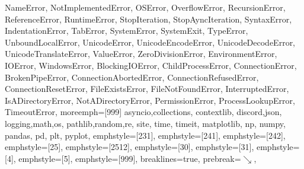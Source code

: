 {{  NameError, NotImplementedError, OSError, OverflowError, RecursionError,
  ReferenceError, RuntimeError, StopIteration, StopAyncIteration, SyntaxError,
  IndentationError, TabError, SystemError, SystemExit, TypeError,
  UnboundLocalError, UnicodeError, UnicodeEncodeError, UnicodeDecodeError,
  UnicodeTranslateError, ValueError, ZeroDivisionError, EnvironmentError,
  IOError, WindowsError,
  BlockingIOError, ChildProcessError, ConnectionError, BrokenPipeError,
  ConnectionAbortedError, ConnectionRefusedError, ConnectionResetError,
  FileExistsError, FileNotFoundError, InterruptedError, IsADirectoryError,
  NotADirectoryError, PermissionError, ProcessLookupError, TimeoutError},
  moreemph=[999]{%
  asyncio,collections, contextlib,
  discord,json,
  logging,math,os,
  pathlib,random,re, site,
  time, timeit,
  matplotlib, np, numpy, pandas, pd, plt, pyplot},
  emphstyle=[231]{\color{magenta}}, %
  emphstyle=[241]{\color{magenta}}, %
  emphstyle=[242]{\color{magenta}}, %
  emphstyle=[25]{\color{brightcyan}}, %
  emphstyle=[2512]{\color{brightblue}}, %
  emphstyle=[30]{\color{brightcyan}},
  emphstyle=[31]{\color{brightblue}}, %
  emphstyle=[4]{\color{brightmagenta}},
  emphstyle=[5]{\bfseries\color{red}},
  emphstyle=[999]{\color{brightyellow}}, %
  breaklines=true,
  prebreak=\mbox{{\color{brightblack}\scriptsize$\searrow$}},
}

\def\cconv#1{%
	\extractcolorspecs{#1}{\model}{\mycolor}
	\definecolor{w}{HTML}{FFFFFF} \definecolor{b}{HTML}{000000}
	\def\c@html{\convertcolorspec{\model}{\mycolor}{HTML}\tmp\tmp}
	\def\c@rgb{\convertcolorspec{\model}{\mycolor}{RGB}\tmp\tmp}
	\def\c@cmyk{\convertcolorspec{\model}{\mycolor}{cmyk}\tmp\tmp}
	\def\chonkyclr{\Large\sf\c@html}
	\vbox{\offinterlineskip\footnotesize\tt\hsize=18em
	\halign{\color{fg}
		\hfil##: &
		\vtop{\hsize=18em\parindent0em\hangindent0em \strut\color{fg}##\strut}&
		\hfil##&\hfil##&\hfil##&\hfil##\cr
		\omit\textcolor{cyan}{\MakeUppercase{\sf Colour info for #1}}\hidewidth\cr\noalign{\medskip}
		\sf HTML&\#\c@html\cr
		\sf RGB&[\c@rgb]\cr
		\sf CMYK&[\c@cmyk]\cr
	}
	\halign{
	\hfil\strut##\strut&\strut##\strut\hfil\cr
	\fcolorbox{w}{w}{\color{#1}\chonkyclr}&
	\fcolorbox{w}{b}{\color{#1}\chonkyclr}\cr
	\fcolorbox{w}{#1}{\color{w}\chonkyclr}&
	\fcolorbox{w}{#1}{\color{b}\chonkyclr}\cr\noalign{\medskip}
		}
	}
}

